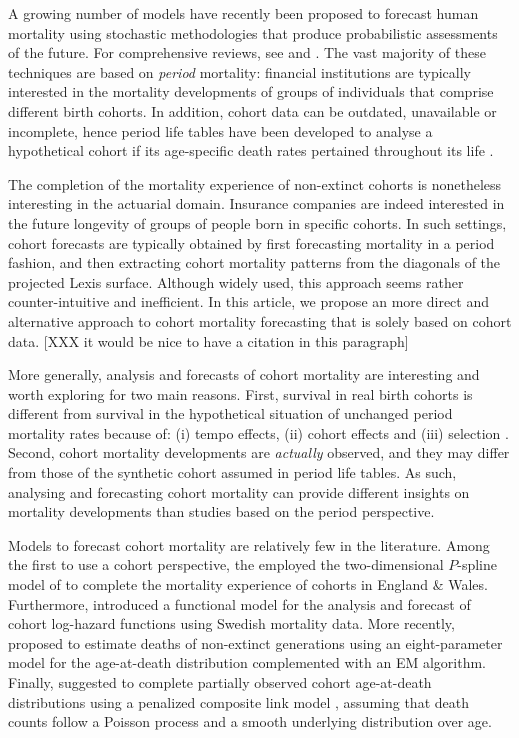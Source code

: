 \documentclass[11pt, a4paper]{article}
\begin{document}
A growing number of models have recently been proposed to forecast human mortality using stochastic methodologies that produce probabilistic assessments of the future. For comprehensive reviews, see \cite{booth2006demographic} and \cite{shang2011point}. The vast majority of these techniques are based on \textit{period} mortality: financial institutions are typically interested in the mortality developments of groups of individuals that comprise different birth cohorts. In addition, cohort data can be outdated, unavailable or incomplete, hence period life tables have been developed to analyse a hypothetical cohort if its age-specific death rates pertained throughout its life \citep{preston2001demogr}.
 
The completion of the mortality experience of non-extinct cohorts is nonetheless interesting in the actuarial domain. Insurance companies are indeed interested in the future longevity of groups of people born in specific cohorts. In such settings, cohort forecasts are typically obtained by first forecasting mortality in a period fashion, and then extracting cohort mortality patterns from the diagonals of the projected Lexis surface. Although widely used, this approach seems rather counter-intuitive and inefficient. In this article, we propose an more direct and alternative approach to cohort mortality forecasting that is solely based on cohort data. [XXX it would be nice to have a citation in this paragraph]

More generally, analysis and forecasts of cohort mortality are interesting and worth exploring for two main reasons. First, survival in real birth cohorts is different from survival in the hypothetical situation of unchanged period mortality rates because of: (i) tempo effects, (ii) cohort effects and (iii) selection \cite[for a full discussion, see][Sect.~2]{borgan2018cohort}. Second, cohort mortality developments are \textit{actually} observed, and they may differ from those of the synthetic cohort assumed in period life tables. As such, analysing and forecasting cohort mortality can provide different insights on mortality developments than studies based on the period perspective.  

Models to forecast cohort mortality are relatively few in the literature. Among the first to use a cohort perspective, the \cite{cmi2007stochastic} employed the two-dimensional $P$-spline model of \cite{currie2004smoothing} to complete the mortality experience of cohorts in England \& Wales. Furthermore, \cite{chiou2009modeling} introduced a functional model for the analysis and forecast of cohort log-hazard functions using Swedish mortality data. More recently, \cite{zanotto2017reconstruction} proposed to estimate deaths of non-extinct generations using an eight-parameter model for the age-at-death distribution complemented with an EM algorithm. Finally, \cite{rizzi2019forecasting} suggested to complete partially observed cohort age-at-death distributions using a penalized composite link model \citep{eilers2007ill}, assuming that death counts follow a Poisson process and a smooth underlying distribution over age. 
\end{document}
